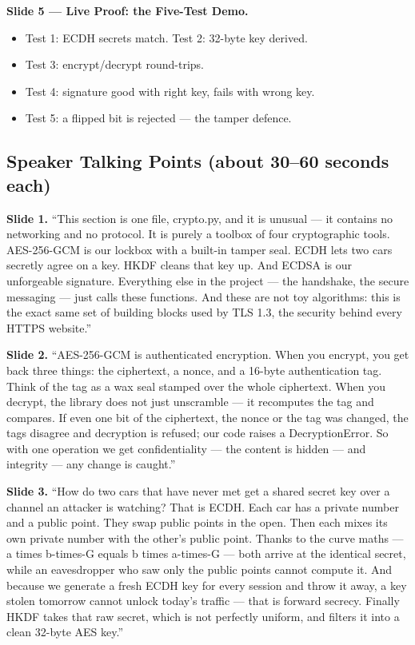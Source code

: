 \documentclass[11pt,a4paper]{report}
\begin{document}
\textbf{Slide 5 --- Live Proof: the Five-Test Demo.}
\begin{itemize}
  \item Test 1: ECDH secrets match. Test 2: 32-byte key derived.
  \item Test 3: encrypt/decrypt round-trips.
  \item Test 4: signature good with right key, fails with wrong key.
  \item Test 5: a flipped bit is rejected --- the tamper defence.
\end{itemize}

\subsection{Speaker Talking Points (about 30--60 seconds each)}

\textbf{Slide 1.} ``This section is one file, crypto.py, and it is unusual ---
it contains no networking and no protocol. It is purely a toolbox of four
cryptographic tools. AES-256-GCM is our lockbox with a built-in tamper seal. ECDH
lets two cars secretly agree on a key. HKDF cleans that key up. And ECDSA is our
unforgeable signature. Everything else in the project --- the handshake, the
secure messaging --- just calls these functions. And these are not toy
algorithms: this is the exact same set of building blocks used by TLS 1.3, the
security behind every HTTPS website.''

\textbf{Slide 2.} ``AES-256-GCM is authenticated encryption. When you encrypt,
you get back three things: the ciphertext, a nonce, and a 16-byte authentication
tag. Think of the tag as a wax seal stamped over the whole ciphertext. When you
decrypt, the library does not just unscramble --- it recomputes the tag and
compares. If even one bit of the ciphertext, the nonce or the tag was changed,
the tags disagree and decryption is refused; our code raises a DecryptionError.
So with one operation we get confidentiality --- the content is hidden --- and
integrity --- any change is caught.''

\textbf{Slide 3.} ``How do two cars that have never met get a shared secret key
over a channel an attacker is watching? That is ECDH. Each car has a private
number and a public point. They swap public points in the open. Then each mixes
its own private number with the other's public point. Thanks to the curve maths
--- a times b-times-G equals b times a-times-G --- both arrive at the identical
secret, while an eavesdropper who saw only the public points cannot compute it.
And because we generate a fresh ECDH key for every session and throw it away, a
key stolen tomorrow cannot unlock today's traffic --- that is forward secrecy.
Finally HKDF takes that raw secret, which is not perfectly uniform, and filters
it into a clean 32-byte AES key.''
\end{document}
